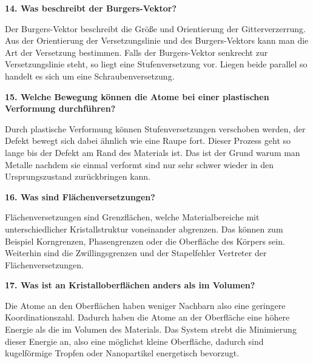 \noindent\textbf{14. Was beschreibt der Burgers-Vektor?}\\
\begin{addmargin}[25pt]{0pt}    
Der Burgers-Vektor beschreibt die Größe und Orientierung der Gitterverzerrung. Aus der Orientierung der Versetzungslinie und des Burgers-Vektors kann man die Art der Versetzung bestimmen. Falls der Burgers-Vektor senkrecht zur Versetzungslinie steht, so liegt eine Stufenversetzung vor. Liegen beide parallel so handelt es sich um eine Schraubenversetzung. \\
\end{addmargin}

\noindent\textbf{15. Welche Bewegung können die Atome bei einer plastischen Verformung durchführen?}\\
\begin{addmargin}[25pt]{0pt}   
Durch plastische Verformung können Stufenversetzungen verschoben werden, der Defekt bewegt sich dabei ähnlich wie eine Raupe fort. Dieser Prozess geht so lange bis der Defekt am Rand des Materials ist. Das ist der Grund warum man Metalle nachdem sie einmal verformt sind nur sehr schwer wieder in den Ursprungszustand zurückbringen kann. \\
\end{addmargin}

\noindent\textbf{16. Was sind Flächenversetzungen?}\\
\begin{addmargin}[25pt]{0pt}    
Flächenversetzungen sind Grenzflächen, welche Materialbereiche mit unterschiedlicher Kristallstruktur voneinander abgrenzen. Das können zum Beispiel Korngrenzen, Phasengrenzen oder die Oberfläche des Körpers sein. Weiterhin sind die Zwillingsgrenzen und der Stapelfehler Vertreter der Flächenversetzungen.  \\
\end{addmargin}

\noindent\textbf{17. Was ist an Kristalloberflächen anders als im Volumen?}\\
\begin{addmargin}[25pt]{0pt}   
Die Atome an den Oberflächen haben weniger Nachbarn also eine geringere Koordinationszahl. Dadurch haben die Atome an der Oberfläche eine höhere Energie als die im Volumen des Materials. Das System strebt die Minimierung dieser Energie an, also eine möglichst kleine Oberfläche, dadurch sind kugelförmige Tropfen oder Nanopartikel energetisch bevorzugt.\\
\end{addmargin}

